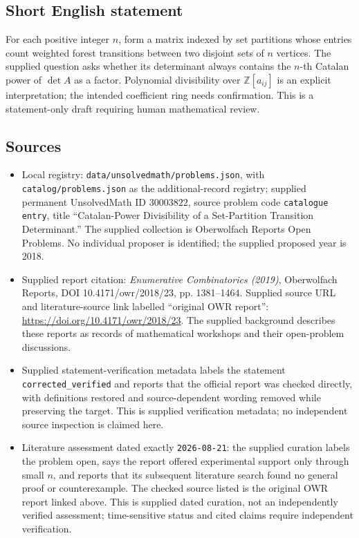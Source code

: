 \documentclass[11pt]{article}
\begin{document}
\subsection{Short English statement}
For each positive integer \(n\), form a matrix indexed by set partitions whose entries count weighted forest transitions between two disjoint sets of \(n\) vertices. The supplied question asks whether its determinant always contains the \(n\)-th Catalan power of \(\det A\) as a factor. Polynomial divisibility over \(\mathbb Z[a_{ij}]\) is an explicit interpretation; the intended coefficient ring needs confirmation. This is a statement-only draft requiring human mathematical review.
\subsection{Sources}
\begin{itemize}
\item Local registry: \texttt{data/unsolvedmath/problems.json}, with \texttt{catalog/problems.json} as the additional-record registry; supplied permanent UnsolvedMath ID \(30003822\), source problem code \texttt{catalogue entry}, title ``Catalan-Power Divisibility of a Set-Partition Transition Determinant.'' The supplied collection is Oberwolfach Reports Open Problems. No individual proposer is identified; the supplied proposed year is 2018.
\item Supplied report citation: \emph{Enumerative Combinatorics (2019)}, Oberwolfach Reports, DOI 10.4171/owr/2018/23, pp. 1381--1464. Supplied source URL and literature-source link labelled ``original OWR report'': \url{https://doi.org/10.4171/owr/2018/23}. The supplied background describes these reports as records of mathematical workshops and their open-problem discussions.
\item Supplied statement-verification metadata labels the statement \texttt{corrected\_verified} and reports that the official report was checked directly, with definitions restored and source-dependent wording removed while preserving the target. This is supplied verification metadata; no independent source inspection is claimed here.
\item Literature assessment dated exactly \texttt{2026-08-21}: the supplied curation labels the problem open, says the report offered experimental support only through small \(n\), and reports that its subsequent literature search found no general proof or counterexample. The checked source listed is the original OWR report linked above. This is supplied dated curation, not an independently verified assessment; time-sensitive status and cited claims require independent verification.
\end{itemize}
\end{document}
